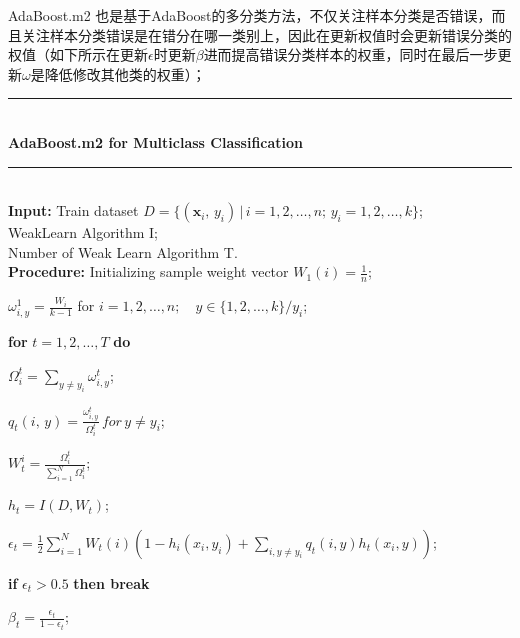 \documentclass[a4paper]{article}
\begin{document}
			AdaBoost.m2 也是基于AdaBoost的多分类方法，不仅关注样本分类是否错误，而且关注样本分类错误是在错分在哪一类别上，因此在更新权值时会更新错误分类的权值（如下所示在更新$\epsilon$时更新$\beta$进而提高错误分类样本的权重，同时在最后一步更新$\omega$是降低修改其他类的权重）；\\
			\noindent\rule[0.1\baselineskip]{\textwidth}{0.75pt}\\
			\textbf{AdaBoost.m2 for Multiclass Classification}\\
			\noindent\rule[0.1\baselineskip]{\textwidth}{0.5pt}\\
			\textbf{Input:} Train dataset $D = \{(\textbf{x}_i,\,y_i)\,|\,i = 1, 2,\dots, n;\, y_i = 1,2,\dots, k\}$;\\
			\hspace*{32pt} WeakLearn Algorithm I;\\
			\hspace*{32pt} Number of Weak Learn Algorithm T.\\
			\textbf{Procedure:} 
					\hspace*{2pt} Initializing sample weight vector $W_1(i) = \frac{1}{n}$;\par
					\hspace*{36pt}$\omega_{i,y}^1 = \frac{W_i}{k-1}$ for $i = 1, 2, \dots, n;\quad y\in \{1,2,\dots,k\}\slash{y_i}$; \par
					\hspace*{32pt} \textbf{for} $t = 1, 2,\dots, T$ \textbf{do}\par
							\hspace*{48pt} $\Omega_i^t = \sum_{y\neq y_i}\omega_{i,y}^t$;\par
							\hspace*{48pt} $q_t(i,\,y) = \frac{\omega_{i,y}^t}{\Omega_i^t}\,for\,y\neq y_i$;\par
							\hspace*{48pt} $W_t^i = \frac{\Omega_i^t}{\sum_{i=1}^{N}\Omega_i^t}$;\par
							\hspace*{48pt} $h_t = I(D, W_t)$;\par
							\hspace*{48pt} $\epsilon_t = \frac{1}{2}\sum_{i=1}^{N}W_t(i)(1-h_i(x_i, y_i)+\sum_{i,y\neq y_i}q_t(i,y)h_t(x_i,y))$;\par
							\hspace*{48pt} \textbf{if} $\epsilon_t > 0.5$ \textbf{then break}\par
							\hspace*{48pt} $\beta_t = \frac{\epsilon_t}{1-\epsilon_t}$;\par
\end{document}
